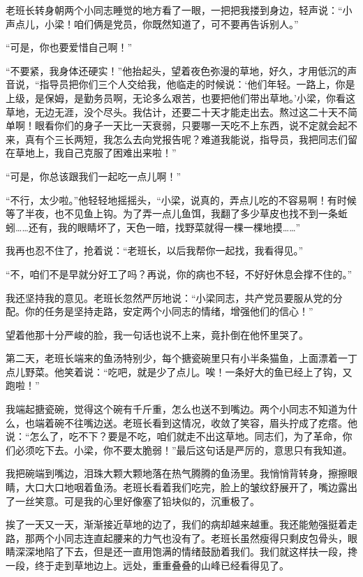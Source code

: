 \documentclass[12pt,UTF-8,openany]{ctexbook}
\begin{document}
\begin{Large}
    老班长转身朝两个小同志睡觉的地方看了一眼，一把把我搂到身边，轻声说：“小声点儿，小梁！咱们俩是党员，你既然知道了，可不要再告诉别人。”
    
    “可是，你也要爱惜自己啊！”
    
    “不要紧，我身体还硬实！”他抬起头，望着夜色弥漫的草地，好久，才用低沉的声音说，“指导员把你们三个人交给我，他临走的时候说：‘他们年轻。一路上，你是上级，是保姆，是勤务员啊，无论多么艰苦，也要把他们带出草地。’小梁，你看这草地，无边无涯，没个尽头。我估计，还要二十天才能走出去。熬过这二十天不简单啊！眼看你们的身子一天比一天衰弱，只要哪一天吃不上东西，说不定就会起不来，真有个三长两短，我怎么去向党报告呢？难道我能说，指导员，我把同志们留在草地上，我自己克服了困难出来啦！”
    
    “可是，你总该跟我们一起吃一点儿啊！”
    
    “不行，太少啦。”他轻轻地摇摇头，“小梁，说真的，弄点儿吃的不容易啊！有时候等了半夜，也不见鱼上钩。为了弄一点儿鱼饵，我翻了多少草皮也找不到一条蚯蚓……还有，我的眼睛坏了，天色一暗，找野菜就得一棵一棵地摸……”
    
    我再也忍不住了，抢着说：“老班长，以后我帮你一起找，我看得见。”
    
    “不，咱们不是早就分好工了吗？再说，你的病也不轻，不好好休息会撑不住的。”
    
    我还坚持我的意见。老班长忽然严厉地说：“小梁同志，共产党员要服从党的分配。你的任务是坚持走路，安定两个小同志的情绪，增强他们的信心！”
    
    望着他那十分严峻的脸，我一句话也说不上来，竟扑倒在他怀里哭了。
    
    第二天，老班长端来的鱼汤特别少，每个搪瓷碗里只有小半条猫鱼，上面漂着一丁点儿野菜。他笑着说：“吃吧，就是少了点儿。唉！一条好大的鱼已经上了钩，又跑啦！”
    
    我端起搪瓷碗，觉得这个碗有千斤重，怎么也送不到嘴边。两个小同志不知道为什么，也端着碗不往嘴边送。老班长看到这情况，收敛了笑容，眉头拧成了疙瘩。他说：“怎么了，吃不下？要是不吃，咱们就走不出这草地。同志们，为了革命，你们必须吃下去。小梁，你不要太脆弱！”最后这句话是严厉的，意思只有我知道。
    
    我把碗端到嘴边，泪珠大颗大颗地落在热气腾腾的鱼汤里。我悄悄背转身，擦擦眼睛，大口大口地咽着鱼汤。老班长看着我们吃完，脸上的皱纹舒展开了，嘴边露出了一丝笑意。可是我的心里好像塞了铅块似的，沉重极了。
    
    挨了一天又一天，渐渐接近草地的边了，我们的病却越来越重。我还能勉强挺着走路，那两个小同志连直起腰来的力气也没有了。老班长虽然瘦得只剩皮包骨头，眼睛深深地陷了下去，但是还一直用饱满的情绪鼓励着我们。我们就这样扶一段，搀一段，终于走到草地边上。远处，重重叠叠的山峰已经看得见了。
    

\end{Large}
\end{document}

